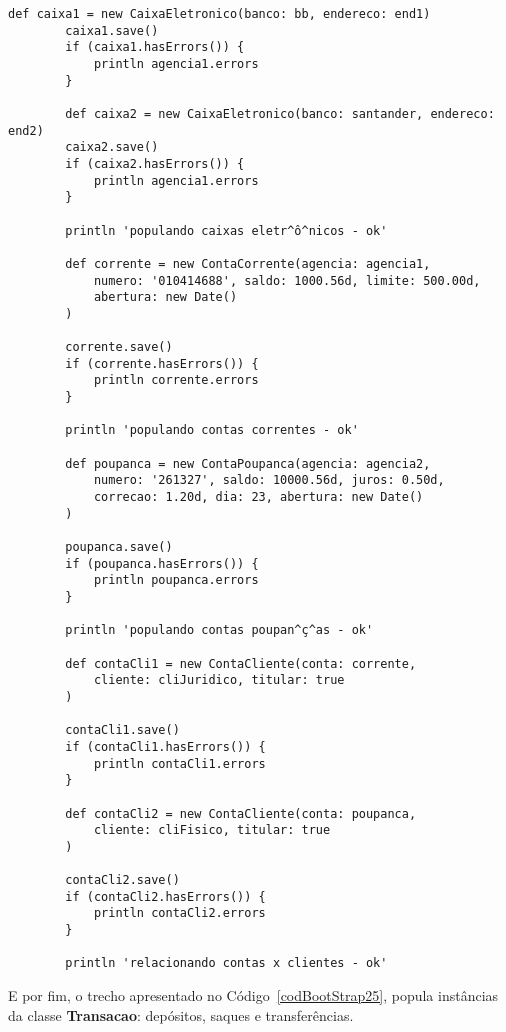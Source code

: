 \begin{lstlisting}[caption={\bf BootStrap.groovy (4)}, frame = trBL, float=htbp,
    label=codBootStrap24]
        def caixa1 = new CaixaEletronico(banco: bb, endereco: end1)
        caixa1.save()
        if (caixa1.hasErrors()) {
            println agencia1.errors
        }
        
        def caixa2 = new CaixaEletronico(banco: santander, endereco: end2)
        caixa2.save()
        if (caixa2.hasErrors()) {
            println agencia1.errors
        }
        
        println 'populando caixas eletr^ô^nicos - ok'

        def corrente = new ContaCorrente(agencia: agencia1, 
            numero: '010414688', saldo: 1000.56d, limite: 500.00d,
            abertura: new Date()
        )
    
        corrente.save()
        if (corrente.hasErrors()) {
            println corrente.errors
        }
        
        println 'populando contas correntes - ok'
                
        def poupanca = new ContaPoupanca(agencia: agencia2, 
            numero: '261327', saldo: 10000.56d, juros: 0.50d,
            correcao: 1.20d, dia: 23, abertura: new Date()
        )
    
        poupanca.save()
        if (poupanca.hasErrors()) {
            println poupanca.errors
        }
        
        println 'populando contas poupan^ç^as - ok'
        
        def contaCli1 = new ContaCliente(conta: corrente, 
            cliente: cliJuridico, titular: true
        )
    
        contaCli1.save()
        if (contaCli1.hasErrors()) {
            println contaCli1.errors
        }
    
        def contaCli2 = new ContaCliente(conta: poupanca, 
            cliente: cliFisico, titular: true
        )
    
        contaCli2.save()
        if (contaCli2.hasErrors()) {
            println contaCli2.errors
        }
        
        println 'relacionando contas x clientes - ok'
\end{lstlisting}

\newpage

E por fim, o trecho apresentado no Código~\ref{codBootStrap25}, popula instâncias
da classe {\bf Transacao}: depósitos, saques e transferências.

